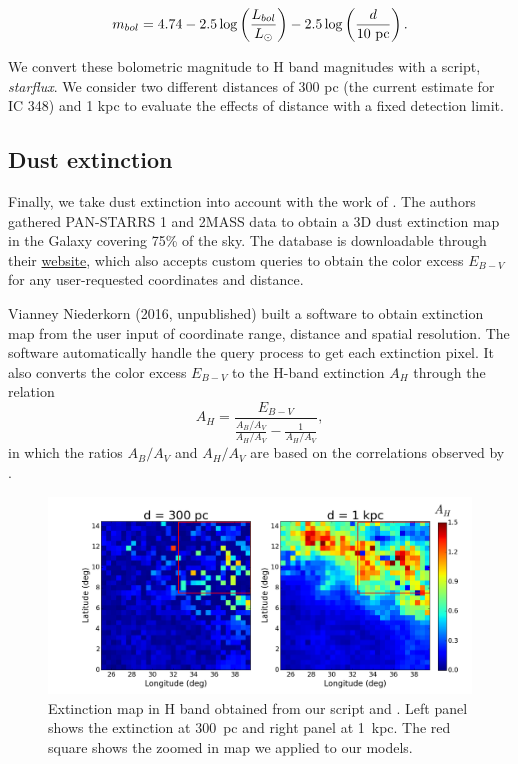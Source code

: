 \begin{equation}
m_{bol} = 4.74- 2.5 \log\left(\frac{L_{bol}}{L_\odot}\right) - 2.5\log\left( \frac{d}{10~{\textrm{pc}}}\right).
\end{equation}

We convert these bolometric magnitude to H band magnitudes with a script, \textit{starflux}. We consider two different distances of 300 pc (the current estimate for IC 348) and 1 kpc to evaluate the effects of distance with a fixed detection limit.

\subsection*{Dust extinction}

Finally, we take dust extinction into account with the work of \cite{Green2015}. The authors gathered PAN-STARRS 1 and 2MASS data to obtain a 3D dust extinction map in the Galaxy covering 75\% of the sky. The database is downloadable through their \href{http://argonaut.skymaps.info/}{website}, which also accepts custom queries to obtain the color excess $E_{B-V}$ for any user-requested coordinates and distance.

Vianney Niederkorn (2016, unpublished) built a software to obtain extinction map from the user input of coordinate range, distance and spatial resolution. The software automatically handle the query process to get each extinction pixel. It also converts the color excess $E_{B-V}$ to the H-band extinction $A_H$ through the relation
\begin{equation}
A_H =   \frac{E_{B-V}}{ \frac{A_B/A_V}{A_H/A_V} - \frac{1}{A_H/A_V} },
\end{equation}
in which the ratios $A_B/A_V$ and $A_H/A_V$ are based on the correlations observed by \cite{Cardelli1989}. 


\begin{figure}
\begin{center}
\includegraphics[width=\textwidth]{Figures/7_dustmaps.png}
\end{center}
\caption{Extinction map in H band obtained from our script and \cite{Green2015}. Left panel shows the extinction at 300~pc and right panel at 1~kpc. The red square shows the zoomed in map we applied to our models.}
\label{Fig:7_dustmaps}
\end{figure} 


